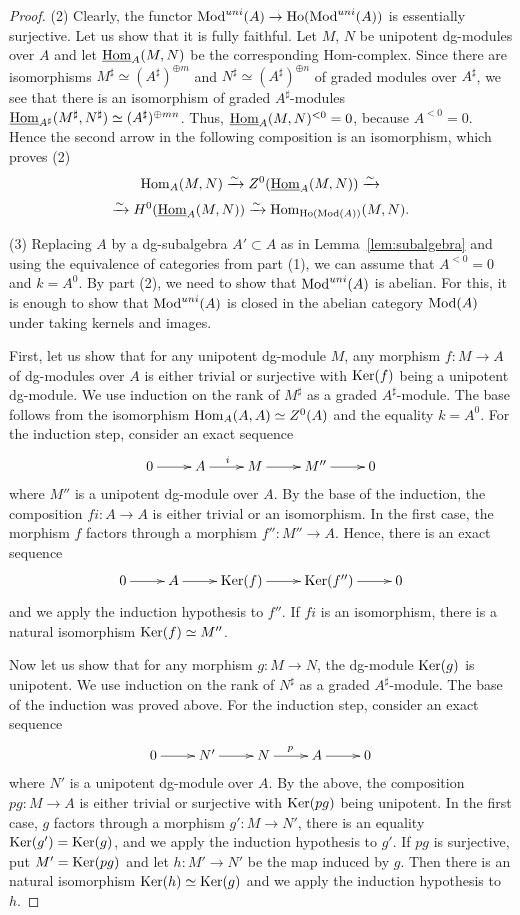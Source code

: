 \documentclass[10pt,russian]{article}
\theoremstyle{plain}
\theoremstyle{definition}
\newcommand{\Hom}{{\rm Hom}}
\newcommand{\Mod}{{\rm Mod}}
\newcommand{\Ho}{{\rm Ho}}
\begin{document}
\begin{proof}
(2) Clearly, the functor ${\Mod^{uni}(A) \to \Ho(\Mod^{uni}(A))}$ is essentially surjective. Let us show that it is fully faithful. Let $M$, $N$ be unipotent dg-modules over $A$ and let $\underline{\Hom}_A(M,N)$ be the corresponding Hom-complex. Since there are isomorphisms ${M^{\sharp} \simeq (A^{\sharp} )^{\oplus m}}$ and ${N^{\sharp} \simeq (A^{\sharp})^{\oplus n}}$ of graded modules over $A^{\sharp}$, we see that there is an isomorphism of graded $A^{\sharp}$-modules ${\underline{\Hom}_{A^{\sharp}}(M^{\sharp},N^{\sharp})\simeq (A^{\sharp})^{\oplus mn}}$. Thus, $\underline{\Hom}_A(M,N)^{<0}=0$, because $A^{<0}=0$. Hence the second arrow in the following composition is an isomorphism, which proves (2)
$$
\Hom_A(M,N) \xrightarrow{\sim} Z^0(\underline{\Hom}_A(M,N)) \xrightarrow{\sim} 
$$
$$
\xrightarrow{\sim}  H^0(\underline{\Hom}_A(M,N)) \xrightarrow{\sim}  \Hom_{\Ho(\Mod(A))}(M,N).
$$

(3) Replacing $A$ by a dg-subalgebra $A'\subset A$ as in Lemma~\ref{lem:subalgebra} and using the equivalence of categories from part (1), we can assume that $A^{<0}=0$ and $k=A^0$. By part (2), we need to show that $\Mod^{uni}(A)$ is abelian. For this, it is enough to show that $\Mod^{uni}(A)$ is closed in the abelian category $\Mod(A)$ under taking kernels and images.

First, let us show that for any unipotent dg-module $M$, any morphism $f\colon M\to A$ of dg-modules over $A$ is either trivial or surjective with ${\rm Ker}(f)$ being a unipotent dg-module. We use induction on the rank of $M^{\sharp}$ as a graded $A^{\sharp}$-module. The base follows from the isomorphism ${\Hom_A(A,A)\simeq Z^0(A)}$ and the equality $k=A^0$. For the induction step, consider an exact sequence
$$
 	\xymatrix{
 		 0 \ar[r] &  A  \ar[r]^{i} & M  \ar[r]  &  M'' \ar[r]& 0
 	}
$$
where $M''$ is a unipotent dg-module over $A$. By the base of the induction, the composition ${fi\colon A\to A}$ is either trivial or an isomorphism. In the first case, the morphism $f$ factors through a morphism $f''\colon M''\to A$. Hence, there is an exact sequence
$$
 	\xymatrix{
 		 0 \ar[r] &  A  \ar[r] & {\rm Ker}(f) \ar[r]  &  {\rm Ker}(f'') \ar[r]& 0
 	}
$$
and we apply the induction hypothesis to $f''$. If $fi$ is an isomorphism, there is a natural isomorphism ${\rm Ker}(f)\simeq M''$.

Now let us show that for any morphism $g\colon M\to N$, the dg-module ${\rm Ker}(g)$ is unipotent. We use induction on the rank of $N^{\sharp}$ as a graded $A^{\sharp}$-module. The base of the induction was proved above. For the induction step, consider an exact sequence
$$
 	\xymatrix{
 		 0 \ar[r] &  N'  \ar[r] & N  \ar[r]^{p}  &  A \ar[r]& 0
 	}
$$
where $N'$ is a unipotent dg-module over $A$.
By the above, the composition ${pg\colon M\to A}$ is either trivial or surjective with ${\rm Ker}(pg)$ being unipotent. In the first case, $g$ factors through a morphism $g'\colon M\to N'$, there is an equality ${\rm Ker}(g')={\rm Ker}(g)$, and we apply the induction hypothesis to $g'$. If $pg$ is surjective, put $M'={\rm Ker}(pg)$ and let $h\colon M'\to N'$ be the map induced by $g$. Then there is an natural isomorphism ${\rm Ker}(h)\simeq {\rm Ker}(g)$ and we apply the induction hypothesis to~$h$.


\end{proof}
\end{document}

